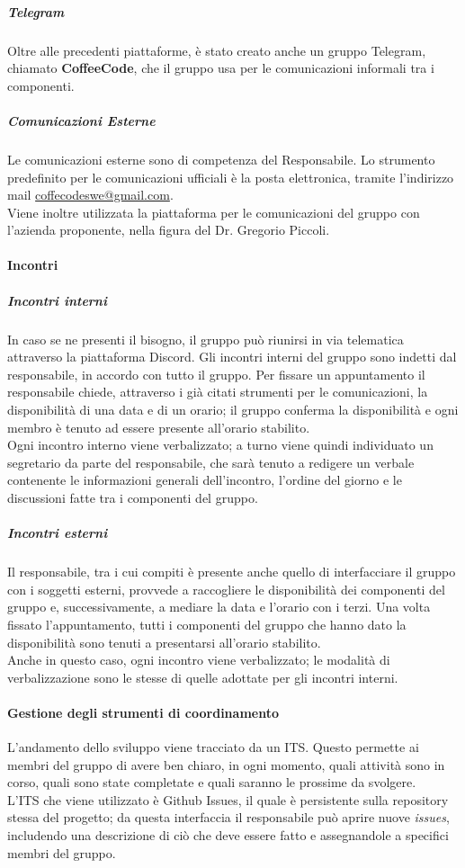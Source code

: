 \documentclass[../norme-di-progetto.tex]{subfiles}
\begin{document}
\subparagraph*{Telegram}
Oltre alle precedenti piattaforme, è stato creato anche un gruppo Telegram, chiamato \textbf{CoffeeCode}, che il gruppo usa per le comunicazioni informali tra i componenti.

\subparagraph{Comunicazioni Esterne}
Le comunicazioni esterne sono di competenza del Responsabile. Lo strumento predefinito per le comunicazioni ufficiali è la posta elettronica, tramite l'indirizzo mail \href{coffecodeswe@gmail.com}{coffecodeswe@gmail.com}. \\
Viene inoltre utilizzata la piattaforma  per le comunicazioni del gruppo con l'azienda proponente, nella figura del Dr. Gregorio Piccoli.

\paragraph{Incontri}
\subparagraph{Incontri interni}
In caso se ne presenti il bisogno, il gruppo può riunirsi in via telematica attraverso la piattaforma Discord. Gli incontri interni del gruppo sono indetti dal responsabile, in accordo con tutto il gruppo. Per fissare un appuntamento il responsabile chiede, attraverso i già citati strumenti per le comunicazioni, la disponibilità di una data e di un orario; il gruppo conferma la disponibilità e ogni membro è tenuto ad essere presente all'orario stabilito. \\
Ogni incontro interno viene verbalizzato; a turno viene quindi individuato un segretario da parte del responsabile, che sarà tenuto a redigere un verbale contenente le informazioni generali dell'incontro, l'ordine del giorno e le discussioni fatte tra i componenti del gruppo.

\subparagraph{Incontri esterni}
Il responsabile, tra i cui compiti è presente anche quello di interfacciare il gruppo con i soggetti esterni, provvede a raccogliere le disponibilità dei componenti del gruppo e, successivamente, a mediare la data e l'orario con i terzi. Una volta fissato l'appuntamento, tutti i componenti del gruppo che hanno dato la disponibilità sono tenuti a presentarsi all'orario stabilito. \\
Anche in questo caso, ogni incontro viene verbalizzato; le modalità di verbalizzazione sono le stesse di quelle adottate per gli incontri interni.

\paragraph{Gestione degli strumenti di coordinamento}
L'andamento dello sviluppo viene tracciato da un ITS. Questo permette ai membri del gruppo di avere ben chiaro, in ogni momento, quali attività sono in corso, quali sono state completate e quali saranno le prossime da svolgere. \\
L'ITS che viene utilizzato è Github Issues, il quale è persistente sulla repository stessa del progetto; da questa interfaccia il responsabile può aprire nuove \textit{issues}, includendo una descrizione di ciò che deve essere fatto e assegnandole a specifici membri del gruppo.
\end{document}
